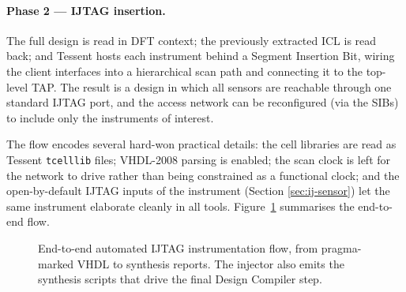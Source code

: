 \paragraph{Phase 2 --- IJTAG insertion.} The full design is read in DFT context;
the previously extracted ICL is read back; and Tessent hosts each instrument
behind a Segment Insertion Bit, wiring the client interfaces into a hierarchical
scan path and connecting it to the top-level TAP. The result is a design in which
all sensors are reachable through one standard IJTAG port, and the access network
can be reconfigured (via the SIBs) to include only the instruments of interest.

The flow encodes several hard-won practical details: the cell libraries are read
as Tessent \texttt{tcelllib} files; VHDL-2008 parsing is enabled; the scan clock
is left for the network to drive rather than being constrained as a functional
clock; and the open-by-default IJTAG inputs of the instrument (Section
\ref{sec:ij-sensor}) let the same instrument elaborate cleanly in all tools.
Figure~\ref{fig:ijtag-flow} summarises the end-to-end flow.

\begin{figure}[htbp]
\centering
{}
\caption{End-to-end automated IJTAG instrumentation flow, from pragma-marked
VHDL to synthesis reports. The injector also emits the synthesis scripts that
drive the final Design Compiler step.}
\label{fig:ijtag-flow}
\end{figure}

